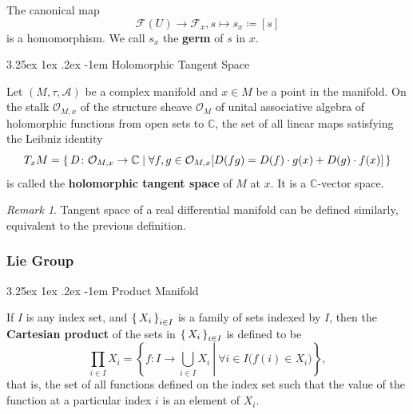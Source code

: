 \documentclass[12pt, letterpaper]{article}
\makeatletter
\newcommand{\co}{\mathbb{C}}
\newcommand{\define}{\coloneqq}
\newcommand{\ec}[1]{\left[{#1}\right]}
\renewcommand\paragraph{\@startsection{paragraph}{4}{\z@}%
	{3.25ex \@plus1ex \@minus.2ex}%
	{-1em}%
	{\normalfont\normalsize\bfseries}}
\theoremstyle{definition}
\theoremstyle{remark}
\newtheorem*{rem*}{Remark}
\theoremstyle{definition}
\theoremstyle{plain}
\numberwithin{equation}{section}
\makeatother
\begin{document}
	\begin{def*}[germ]
		The canonical map
		\[\mathcal{F}(U) \to \mathcal{F}_x, s \mapsto s_x \define \ec{s}\]
		is a homomorphism. We call $s_x$ the
		\textbf{germ} of $s$ in $x$.
	\end{def*}

	\paragraph{Holomorphic Tangent Space}
	
	\begin{def*}
		Let $(M,\tau,\mathcal{A})$ be a complex manifold and $x\in M$ be a point in the manifold.
		On the stalk $\mathcal{O}_{M,x}$ of the structure sheave $\mathcal{O}_M$
		of unital associative algebra of holomorphic functions from open sets to $\co$,
		the set of all linear maps satisfying the Leibniz identity
		\[T_xM=\set{D\colon\mathcal{O}_{M,x}\to\co | \forall f,g\in\mathcal{O}_{M,x}[ D(fg)=D(f)\cdot g(x)+D(g)\cdot f(x)] }\]
		is called the \textbf{holomorphic tangent space} of $M$ at $x$.
		It is a $\co$-vector space.
	\end{def*}
	\begin{rem*}
		Tangent space of a real differential manifold can be defined similarly,
		equivalent to the previous definition.
	\end{rem*}
	
	\subsubsection{Lie Group}
	\paragraph{Product Manifold}
	
	\begin{def*}
		If $I$ is any index set, and $\set{X_{i}}_{i\in I}$ is a family of sets indexed by $I$,
		then the \textbf{Cartesian product} of the sets in $\set{X_{i}}_{i\in I}$ is defined to be
		\[\prod _{i\in I}X_{i}=\left\{\left.f\colon I\to \bigcup _{i\in I}X_{i}\ \right|\ \forall i\in I\Big(f(i)\in X_{i}\Big)\right\},\]
		that is, the set of all functions defined on the index set such that the value of the function at a particular index $i$ is an element of $X_i$.
	\end{def*}
\end{document}
